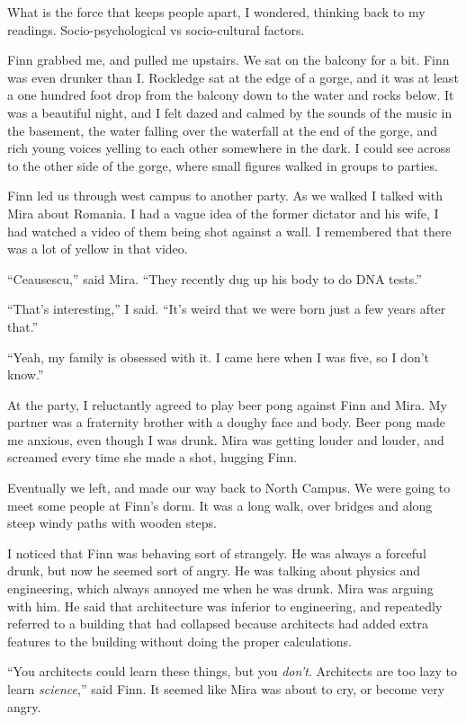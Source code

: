 What is the force that keeps people apart, I wondered, thinking back to my
readings.  Socio-psychological vs socio-cultural factors.  

Finn grabbed me, and pulled me upstairs.  We sat on the balcony for a bit.  Finn
was even drunker than I.  Rockledge sat at the edge of a gorge, and it was at
least a one hundred foot drop from the balcony down to the water and rocks
below.  It was a beautiful night, and I felt dazed and calmed by the sounds of
the music in the basement, the water falling over the waterfall at the end of
the gorge, and rich young voices yelling to each other somewhere in the dark.  I
could see across to the other side of the gorge, where small figures walked in
groups to parties.

Finn led us through west campus to another party.  As we walked I talked with
Mira about Romania.  I had a vague idea of the former dictator and his wife, I
had watched a video of them being shot against a wall.  I remembered that there
was a lot of yellow in that video.  

``Ceausescu,'' said Mira.  ``They recently dug up his body to do DNA tests.''  

``That's interesting,'' I said.  ``It's weird that we were born just a few years
after that.''  

``Yeah, my family is obsessed with it.  I came here when I was five, so I don't
know.''

At the party, I reluctantly agreed to play beer pong against Finn and Mira.  My
partner was a fraternity brother with a doughy face and body.  Beer pong made me
anxious, even though I was drunk.  Mira was getting louder and louder, and
screamed every time she made a shot, hugging Finn.

Eventually we left, and made our way back to North Campus.  We were going to
meet some people at Finn's dorm.  It was a long walk, over bridges and along
steep windy paths with wooden steps.

I noticed that Finn was behaving sort of strangely.  He was always a forceful
drunk, but now he seemed sort of angry.  He was talking about physics and
engineering, which always annoyed me when he was drunk.  Mira was arguing with
him.  He said that architecture was inferior to engineering, and repeatedly
referred to a building that had collapsed because architects had added extra
features to the building without doing the proper calculations.

``You architects could learn these things, but you \textit{don't}.  Architects
are too lazy to learn \textit{science},'' said Finn.  It seemed like Mira was
about to cry, or become very angry.

